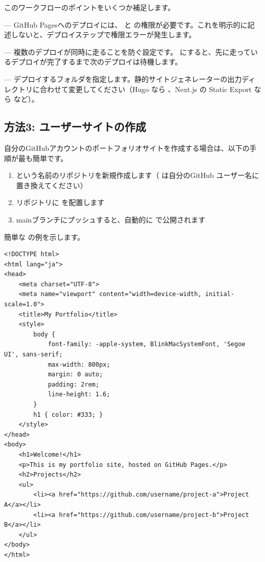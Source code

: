 このワークフローのポイントをいくつか補足します。

\textbf{} --- GitHub Pagesへのデプロイには、 と  の権限が必要です。これを明示的に記述しないと、デプロイステップで権限エラーが発生します。

\textbf{} --- 複数のデプロイが同時に走ることを防ぐ設定です。 にすると、先に走っているデプロイが完了するまで次のデプロイは待機します。

\textbf{} --- デプロイするフォルダを指定します。静的サイトジェネレーターの出力ディレクトリに合わせて変更してください（Hugo なら 、Next.js の Static Export なら  など）。

\subsection{方法3: ユーザーサイトの作成}

自分のGitHubアカウントのポートフォリオサイトを作成する場合は、以下の手順が最も簡単です。

\begin{enumerate}
  \item {} という名前のリポジトリを新規作成します（ は自分のGitHub ユーザー名に置き換えてください）
  \item リポジトリに  を配置します
  \item mainブランチにプッシュすると、自動的に  で公開されます
\end{enumerate}

簡単な  の例を示します。

\begin{lstlisting}[language={}]
<!DOCTYPE html>
<html lang="ja">
<head>
    <meta charset="UTF-8">
    <meta name="viewport" content="width=device-width, initial-scale=1.0">
    <title>My Portfolio</title>
    <style>
        body {
            font-family: -apple-system, BlinkMacSystemFont, 'Segoe UI', sans-serif;
            max-width: 800px;
            margin: 0 auto;
            padding: 2rem;
            line-height: 1.6;
        }
        h1 { color: #333; }
    </style>
</head>
<body>
    <h1>Welcome!</h1>
    <p>This is my portfolio site, hosted on GitHub Pages.</p>
    <h2>Projects</h2>
    <ul>
        <li><a href="https://github.com/username/project-a">Project A</a></li>
        <li><a href="https://github.com/username/project-b">Project B</a></li>
    </ul>
</body>
</html>
\end{lstlisting}

